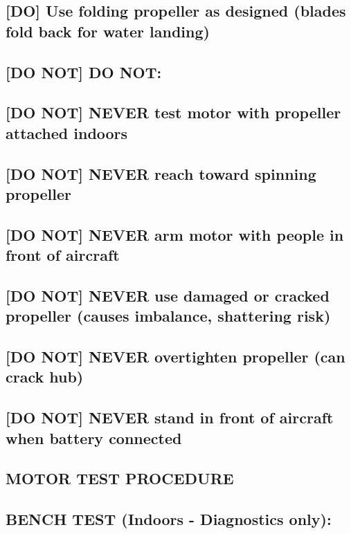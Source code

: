 \documentclass[11pt,letterpaper]{article}
\begin{document}
\subsection*{[DO] Use folding propeller as designed (blades fold back for water landing)}

\subsection*{[DO NOT] DO NOT:}

\subsection*{[DO NOT] NEVER test motor with propeller attached indoors}

\subsection*{[DO NOT] NEVER reach toward spinning propeller}

\subsection*{[DO NOT] NEVER arm motor with people in front of aircraft}

\subsection*{[DO NOT] NEVER use damaged or cracked propeller (causes imbalance, shattering risk)}

\subsection*{[DO NOT] NEVER overtighten propeller (can crack hub)}

\subsection*{[DO NOT] NEVER stand in front of aircraft when battery connected}

\subsection*{MOTOR TEST PROCEDURE}

\subsection*{BENCH TEST (Indoors - Diagnostics only):}
\end{document}
